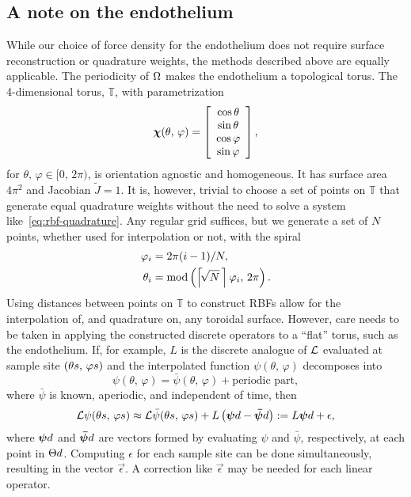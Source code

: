 \subsection{A note on the endothelium}
While our choice of force density for the endothelium does not require surface
reconstruction or quadrature weights, the methods described above are equally applicable.
The periodicity of $\Omega$ makes the endothelium a topological torus. The 4-dimensional
torus, $\mathbb{T}$, with parametrization
\begin{equation*}
    \boldsymbol{\chi}(\theta,\,\varphi) = \left[\begin{array}{c}
            \cos\theta\\ \sin\theta \\ \cos\varphi \\ \sin\varphi
    \end{array}\right],
\end{equation*}
for $\theta,\,\varphi\in[0,\,2\pi)$, is orientation agnostic and homogeneous. It has
surface area $4\pi^2$ and Jacobian $\tilde{J} = 1$. It is, however, trivial to choose a
set of points on $\mathbb{T}$ that generate equal quadrature weights without the need to
solve a system like~\eqref{eq:rbf-quadrature}. Any regular grid suffices, but we generate
a set of $N$ points, whether used for interpolation or not, with the spiral
\begin{align*}
    \varphi_i &= 2\pi (i-1)/N, \\
    \theta_i &= \modulo\left(\left\lceil\!\sqrt{N}\mskip\thinmuskip\right\rceil\varphi_i,\,2\pi\right).
\end{align*}
Using distances between points
on $\mathbb{T}$ to construct RBFs allow for the interpolation of, and quadrature on, any
toroidal surface. However, care needs to be taken in applying the constructed discrete
operators to a ``flat'' torus, such as the endothelium. If, for example, $L$ is the
discrete analogue of $\mathcal{L}$ evaluated at sample site $(\sample\theta,\,\sample\varphi)$ and
the interpolated function $\psi(\theta,\,\varphi)$ decomposes into
\begin{equation*}
    \psi(\theta,\,\varphi) = \bar{\psi}(\theta,\,\varphi) + \text{periodic part},
\end{equation*}
where $\bar{\psi}$ is known, aperiodic, and independent of time, then
\begin{equation*}
    \L\psi(\sample\theta,\,\sample\varphi)
    \approx \L\bar{\psi}(\sample\theta,\,\sample\varphi) + L\left(\data{\vec{\psi}} - \data{\vec{\bar{\psi}}}\right)
    := L\data{\vec{\psi}} + \epsilon,
\end{equation*}
where $\data{\vec{\psi}}$ and $\data{\vec{\bar{\psi}}}$ are vectors formed by evaluating
$\psi$ and $\bar{\psi}$, respectively, at each point in $\data\sites$. Computing
$\epsilon$ for each sample site can be done simultaneously, resulting in the vector
$\vec{\epsilon}$. A correction like $\vec{\epsilon}$ may be needed for each linear
operator.
